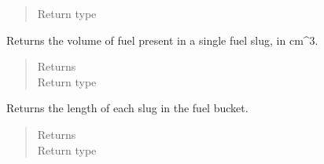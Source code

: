 \documentclass[letterpaper,10pt,openany,oneside,english]{sphinxmanual}
\begin{document}
\begin{fulllineitems}
\begin{fulllineitems}
\begin{quote}
\begin{description}
\item[{Return type}] \leavevmode
{}

\end{description}\end{quote}

\end{fulllineitems}


\begin{fulllineitems}
\label{\detokenize{support_rst/fuel_bucket:fuel_bucket.FuelBucket.get_slug_fuel_volume}}
Returns the volume of fuel present in a single fuel slug, in cm\textasciicircum{}3.
\begin{quote}\begin{description}
\item[{Returns}] \leavevmode
{}

\item[{Return type}] \leavevmode
{}

\end{description}\end{quote}

\end{fulllineitems}


\begin{fulllineitems}
\label{\detokenize{support_rst/fuel_bucket:fuel_bucket.FuelBucket.get_slug_length}}
Returns the length of each slug in the fuel bucket.
\begin{quote}\begin{description}
\item[{Returns}] \leavevmode
{}

\item[{Return type}] \leavevmode
{}

\end{description}\end{quote}

\end{fulllineitems}


\end{fulllineitems}
\end{document}
